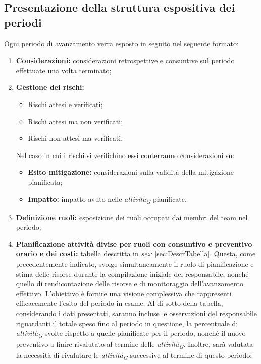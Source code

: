 \subsection{Presentazione della struttura espositiva dei periodi}
Ogni periodo di avanzamento verra esposto in seguito nel seguente formato:
\begin{enumerate}
    \item \textbf{Considerazioni:} considerazioni retrospettive e consuntive sul periodo effettuate una volta terminato;

    \pagebreak
    
    \item \textbf{Gestione dei rischi:}
            \begin{itemize}
                \item Rischi attesi e verificati;
                \item Rischi attesi ma non verificati;
                \item Rischi non attesi ma verificati.
            \end{itemize}
        Nel caso in cui i rischi si verifichino essi conterranno considerazioni su:
        \begin{itemize}
            \item \textbf{Esito mitigazione:} considerazioni sulla validità della mitigazione pianificata;
            \item \textbf{Impatto:} impatto avuto nelle \textit{attività}\textsubscript{\textit{G}} pianificate.
        \end{itemize}
    \item \textbf{Definizione ruoli:} esposizione dei ruoli occupati dai membri del team nel periodo;
    \item \textbf{Pianificazione attività divise per ruoli con consuntivo e preventivo orario e dei costi:} tabella descritta in \textit{sez:} \ref{sec:DescrTabella}.
    Questa, come precedentemente indicato, svolge simultaneamente il ruolo di pianificazione e stima delle risorse durante la compilazione iniziale del responsabile, nonché quello di rendicontazione delle risorse e di monitoraggio dell'avanzamento effettivo. L'obiettivo è fornire una visione complessiva che rappresenti efficacemente l'esito del periodo in esame.
    Al di sotto della tabella, considerando i dati presentati, saranno incluse le osservazioni del responsabile riguardanti il totale speso fino al periodo in questione, la percentuale di \textit{attività}\textsubscript{\textit{G}} svolte rispetto a quelle pianificate per il periodo, nonché il nuovo preventivo a finire rivalutato al termine delle \textit{attività}\textsubscript{\textit{G}}. Inoltre, sarà valutata la necessità di rivalutare le \textit{attività}\textsubscript{\textit{G}} successive al termine di questo periodo;

\end{enumerate}
